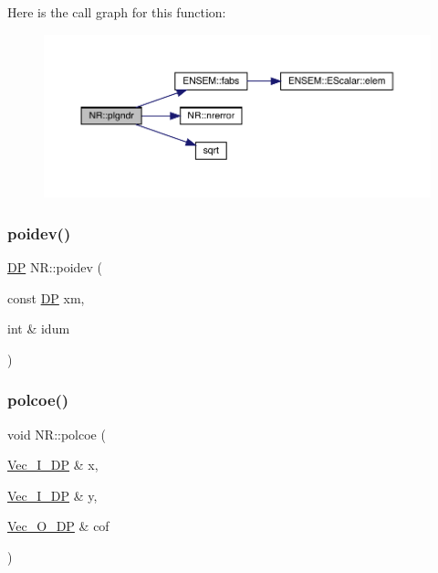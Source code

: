 Here is the call graph for this function\+:
\nopagebreak
\begin{figure}[H]
\begin{center}
\leavevmode
\includegraphics[width=350pt]{da/d46/namespaceNR_a677f4e9cdd801b4a29b667ac6915ac26_cgraph}
\end{center}
\end{figure}
\mbox{\label{namespaceNR_a0612378e73208e941cd53484771f52bb}} 
\subsubsection{\texorpdfstring{poidev()}{poidev()}}
{\footnotesize\ttfamily \mbox{\hyperlink{namespaceNR_af6ff762dd605ff477b8e52387253a02a}{DP}} N\+R\+::poidev (\begin{DoxyParamCaption}\item[{const \mbox{\hyperlink{namespaceNR_af6ff762dd605ff477b8e52387253a02a}{DP}}}]{xm,  }\item[{int \&}]{idum }\end{DoxyParamCaption})}

\mbox{\label{namespaceNR_a404e4e04344a84403f08fcd906a91b2d}} 
\subsubsection{\texorpdfstring{polcoe()}{polcoe()}}
{\footnotesize\ttfamily void N\+R\+::polcoe (\begin{DoxyParamCaption}\item[{\mbox{\hyperlink{namespaceNR_a9f943da53862537c552e2a770cb170ae}{Vec\+\_\+\+I\+\_\+\+DP}} \&}]{x,  }\item[{\mbox{\hyperlink{namespaceNR_a9f943da53862537c552e2a770cb170ae}{Vec\+\_\+\+I\+\_\+\+DP}} \&}]{y,  }\item[{\mbox{\hyperlink{namespaceNR_a970094d23441f8ef6a45282a7eb2103d}{Vec\+\_\+\+O\+\_\+\+DP}} \&}]{cof }\end{DoxyParamCaption})}

